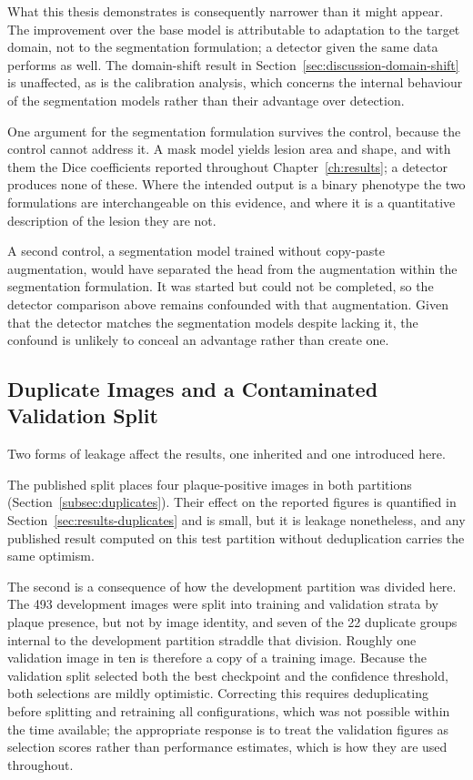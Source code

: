 What this thesis demonstrates is consequently narrower than it might appear. The improvement over
the base model is attributable to adaptation to the target domain, not to the segmentation
formulation; a detector given the same data performs as well. The domain-shift result in
Section~\ref{sec:discussion-domain-shift} is unaffected, as is the calibration analysis, which
concerns the internal behaviour of the segmentation models rather than their advantage over
detection.

One argument for the segmentation formulation survives the control, because the control cannot
address it. A mask model yields lesion area and shape, and with them the Dice coefficients
reported throughout Chapter~\ref{ch:results}; a detector produces none of these. Where the
intended output is a binary phenotype the two formulations are interchangeable on this evidence,
and where it is a quantitative description of the lesion they are not.

A second control, a segmentation model trained without copy-paste augmentation, would have
separated the head from the augmentation within the segmentation formulation. It was started but
could not be completed, so the detector comparison above remains confounded with that
augmentation. Given that the detector matches the segmentation models despite lacking it, the
confound is unlikely to conceal an advantage rather than create one.

\subsection{Duplicate Images and a Contaminated Validation Split}

Two forms of leakage affect the results, one inherited and one introduced here.

The published split places four plaque-positive images in both partitions
(Section~\ref{subsec:duplicates}). Their effect on the reported figures is quantified in
Section~\ref{sec:results-duplicates} and is small, but it is leakage nonetheless, and any
published result computed on this test partition without deduplication carries the same
optimism.

The second is a consequence of how the development partition was divided here. The 493
development images were split into training and validation strata by plaque presence, but not by
image identity, and seven of the 22 duplicate groups internal to the development partition
straddle that division. Roughly one validation image in ten is therefore a copy of a training
image. Because the validation split selected both the best checkpoint and the confidence
threshold, both selections are mildly optimistic. Correcting this requires deduplicating before
splitting and retraining all configurations, which was not possible within the time available;
the appropriate response is to treat the validation figures as selection scores rather than
performance estimates, which is how they are used throughout.

